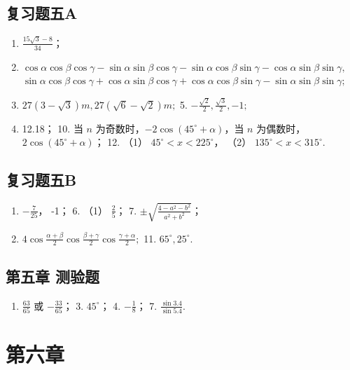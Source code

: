 \subsection{复习题五A}

\begin{enumerate}
\item
  \(\frac{15\sqrt{3} - 8}{34}\)；
\item
  \(\cos \alpha \cos \beta \cos \gamma - \sin \alpha \sin \beta \cos \gamma - \sin \alpha \cos \beta \sin \gamma - \cos \alpha \sin \beta \sin \gamma,\)
  \(\sin \alpha \cos \beta \cos \gamma + \cos \alpha \sin \beta \cos \gamma + \cos \alpha \cos \beta \sin \gamma - \sin \alpha \sin \beta \sin \gamma;\)
\item
  \(27(3-\sqrt{3})m, 27(\sqrt{6}-\sqrt{2})m;\) 5.
  \(-\frac{\sqrt{2}}{2}, \frac{\sqrt{3}}{2}, -1;\)
\item
  12.18； 10. 当 \(n\) 为奇数时，\(-2\cos(45^\circ + \alpha)\)，当 \(n\)
  为偶数时，\(2\cos(45^\circ + \alpha)\)； 12. （1）
  \(45^\circ < x < 225^\circ\)， （2） \(135^\circ < x < 315^\circ\).
\end{enumerate}

\subsection{复习题五B}

\begin{enumerate}
\item
  \(-\frac{7}{25}\)， -1； 6. （1） \(\frac{2}{5}\)； 7.
  \(\pm\sqrt{\frac{4-a^{2}-b^{2}}{a^{2}+b^{2}}}\)；
\item
  \(4\cos \frac{\alpha + \beta}{2}\cos \frac{\beta + \gamma}{2}\cos \frac{\gamma + \alpha}{2};\)
  11. \(65^{\circ}, 25^{\circ}\).
\end{enumerate}

\subsection{第五章 测验题}

\begin{enumerate}[start=2]
\item
  \(\frac{63}{65}\) 或 \(-\frac{33}{65}\)； 3. \(45^{\circ}\)； 4.
  \(-\frac{1}{8}\)； 7. \(\frac{\sin 3.4}{\sin 5.4}\).
\end{enumerate}

\section{第六章}

